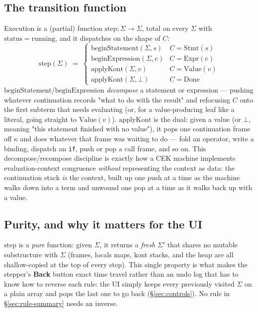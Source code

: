 \documentclass[11pt]{article}
\begin{document}
\subsection{The transition function}

Execution is a (partial) function $\mathrm{step} : \Sigma \to \Sigma$,
total on every $\Sigma$ with $\mathrm{status} = \mathrm{running}$, and it
dispatches on the shape of $C$:
\[
  \mathrm{step}(\Sigma) \;=\;
  \begin{cases}
    \mathrm{beginStatement}(\Sigma, s) & C = \mathrm{Stmt}(s) \\
    \mathrm{beginExpression}(\Sigma, e) & C = \mathrm{Expr}(e) \\
    \mathrm{applyKont}(\Sigma, v) & C = \mathrm{Value}(v) \\
    \mathrm{applyKont}(\Sigma, \bot) & C = \mathrm{Done}
  \end{cases}
\]
$\mathrm{beginStatement}$/$\mathrm{beginExpression}$ \emph{decompose} a
statement or expression --- pushing whatever continuation records "what to
do with the result" and refocusing $C$ onto the first subterm that needs
evaluating (or, for a value-producing leaf like a literal, going straight
to $\mathrm{Value}(v)$). $\mathrm{applyKont}$ is the dual: given a value
(or $\bot$, meaning "this statement finished with no value"), it pops one
continuation frame off $\kappa$ and does whatever that frame was waiting to
do --- fold an operator, write a binding, dispatch an \texttt{if}, push or
pop a call frame, and so on. This decompose/recompose discipline is exactly
how a CEK machine implements evaluation-context congruence \emph{without}
representing the context as data: the continuation stack \emph{is} the
context, built up one push at a time as the machine walks down into a term
and unwound one pop at a time as it walks back up with a value.

\subsection{Purity, and why it matters for the UI}

$\mathrm{step}$ is a \emph{pure} function: given $\Sigma$, it returns a
\emph{fresh} $\Sigma'$ that shares no mutable substructure with $\Sigma$
(frames, locals maps, kont stacks, and the heap are all shallow-copied at
the top of every step). This single property is what makes the stepper's
\textbf{Back} button exact time travel rather than an undo log that has to
know how to reverse each rule: the UI simply keeps every previously visited
$\Sigma$ on a plain array and pops the last one to go back
(\S\ref{sec:controls}). No rule in \S\ref{sec:rule-summary} needs an
inverse.
\end{document}
